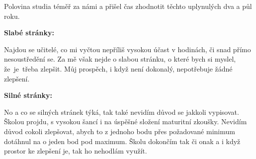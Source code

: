 \documentclass[12pt]{article}
\begin{document}
Polovina studia téměř za námi a přišel čas zhodnotit těchto uplynulých dva a půl roku.

\hspace{1em}

\quad\textbf{Slabé stránky:}

Najdou se učitelé, co mi vyčtou nepříliš vysokou účast v hodinách, či snad přímo nesoustředění se.
Za mě však nejde o slabou stránku, o které bych si myslel, že~je~třeba zlepšit.
Můj prospěch, i když není dokonalý, nepotřebuje žádné zlepšení.

\hspace{1em}

\quad\textbf{Silné stránky:}

No a co se silných stránek týká, tak také nevidím důvod se jakkoli vypisovat.
Školou projdu, s vysokou šancí i na úspěšné složení maturitní zkoušky.
Nevidím důvod cokoli zlepšovat, abych to z jednoho bodu přes požadované minimum dotáhnul na o jeden bod pod maximum.
Školu dokončím tak či onak a i když prostor ke zlepšení je, tak ho nehodlám využít.
\end{document}

